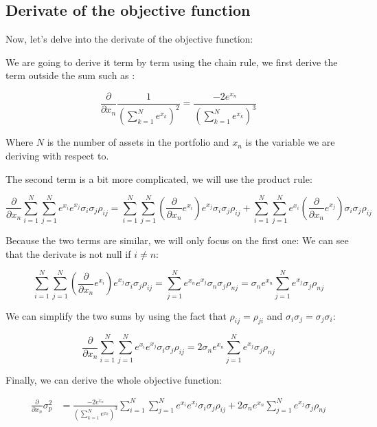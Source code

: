 \documentclass[12pt]{article}
\begin{document}
\subsection*{Derivate of the objective function}

Now, let's delve into the derivate of the objective function:

We are going to derive it term by term using the chain rule, we first derive the term outside the sum such as :

\begin{equation}
    \frac{\partial}{\partial x_n} \frac{1}{(\sum_{k=1}^{N} e^{x_k})^{2}} = \frac{-2 e^{x_n}}{(\sum_{k=1}^{N} e^{x_k})^{3}}
\end{equation}

Where $N$ is the number of assets in the portfolio and $x_n$ is the variable we are deriving with respect to.

The second term is a bit more complicated, we will use the product rule:

\begin{equation}
    \frac{\partial}{\partial x_n} \sum_{i=1}^{N}\sum_{j=1}^{N} e^{x_i} e^{x_j}\sigma_i \sigma_j \rho_{ij} = \sum_{i=1}^{N}\sum_{j=1}^{N}( \frac{\partial}{\partial x_n} e^{x_i} ) e^{x_j}\sigma_i \sigma_j \rho_{ij} + \sum_{i=1}^{N}\sum_{j=1}^{N} e^{x_i}( \frac{\partial}{\partial x_n} e^{x_j} )\sigma_i \sigma_j \rho_{ij} 
\end{equation}

Because the two terms are similar, we will only focus on the first one:
We can see that the derivate is not null if $i \neq n$:

\begin{equation}
    \sum_{i=1}^{N}\sum_{j=1}^{N}( \frac{\partial}{\partial x_n} e^{x_i} ) e^{x_j}\sigma_i \sigma_j \rho_{ij} = \sum_{j=1}^{N} e^{x_n} e^{x_j}\sigma_n \sigma_j \rho_{nj} = \sigma_n e^{x_n} \sum_{j=1}^{N} e^{x_j}\sigma_j \rho_{nj}
\end{equation}

We can simplify the two sums by using the fact that $\rho_{ij} = \rho_{ji}$ and $\sigma_i \sigma_j = \sigma_j \sigma_i$:

\begin{equation}
    \frac{\partial}{\partial x_n} \sum_{i=1}^{N}\sum_{j=1}^{N} e^{x_i} e^{x_j}\sigma_i \sigma_j \rho_{ij} = 2 \sigma_n e^{x_n} \sum_{j=1}^{N} e^{x_j}\sigma_j \rho_{nj}
\end{equation}

Finally, we can derive the whole objective function:

\begin{equation}
    \begin{aligned}
        \frac{\partial}{\partial x_n} \sigma_p^2 & = \frac{-2 e^{x_n}}{(\sum_{k=1}^{N} e^{x_k})^{3}} \sum_{i=1}^{N}\sum_{j=1}^{N} e^{x_i} e^{x_j}\sigma_i \sigma_j \rho_{ij} + 2 \sigma_n e^{x_n} \sum_{j=1}^{N} e^{x_j}\sigma_j \rho_{nj} \\
    \end{aligned}
\end{equation}
\end{document}
